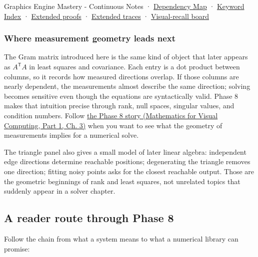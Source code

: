 {Graphics Engine Mastery - Continuous Notes} · \hyperref[appendix-4ad47bdd269a]{Dependency Map} · \hyperref[appendix-a6d556a4ef50]{Keyword Index} · \hyperref[02-foundations-ii-ch039-phase-6---geometry-reconstruction-proofs]{Extended proofs} · \hyperref[appendix-92ff77d4dfdc-phase-6---the-robot-panel-tracebook]{Extended traces} · \hyperref[appendix-38d9c8aca357]{Visual-recall board}

\subsubsection{Where measurement geometry leads next}\label{02-foundations-ii-ch039-where-measurement-geometry-leads-next}

\hypertarget{02-foundations-ii-ch039-where-measurement-geometry-leads-next}{}

The Gram matrix introduced here is the same kind of object that later appears as \(A^\mathsf T A\) in least squares and covariance. Each entry is a dot product between columns, so it records how measured directions overlap. If those columns are nearly dependent, the measurements almost describe the same direction; solving becomes sensitive even though the equations are syntactically valid. Phase 8 makes that intuition precise through rank, null spaces, singular values, and condition numbers. Follow \href{../02-Mathematics-for-Visual-Computing-P01/main.pdf\#01-foundations-i-ch019-the-graphics-problem-hiding-inside-a-matrix-equation}{the Phase 8 story (Mathematics for Visual Computing, Part 1, Ch. 3)} when you want to see what the geometry of measurements implies for a numerical solve.

The triangle panel also gives a small model of later linear algebra: independent edge directions determine reachable positions; degenerating the triangle removes one direction; fitting noisy points asks for the closest reachable output. Those are the geometric beginnings of rank and least squares, not unrelated topics that suddenly appear in a solver chapter.

\subsection{A reader route through Phase 8}\label{02-foundations-ii-ch039-a-reader-route-through-phase-8}

\hypertarget{02-foundations-ii-ch039-a-reader-route-through-phase-8}{}

Follow the chain from what a system means to what a numerical library can promise:

